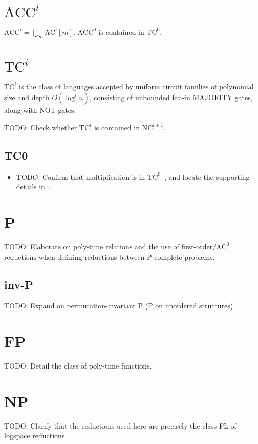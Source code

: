 \section{\texorpdfstring{$\text{ACC}^i$}{ACC\string^i}}
$\text{ACC}^i = \bigcup_m \text{AC}^i[m]$. $\text{ACC}^0$ is contained in $\text{TC}^0$.

\section{\texorpdfstring{$\text{TC}^i$}{TC\string^i}}
$\text{TC}^i$ is the class of languages accepted by uniform circuit families 
of polynomial size and depth $O(\log^i n)$, consisting of unbounded fan-in MAJORITY
gates, along with NOT gates.

TODO: Check whether $\text{TC}^i$ is contained in $\text{NC}^{i + 1}$.
\subsection{TC0}
\begin{itemize}
\item TODO: Confirm that multiplication is in $\text{TC}^0$~\cite{BussLectureNotes}, and locate the supporting details in~\cite{doi:10.1137/0213028}.
\end{itemize}


\section{P}
TODO: Elaborate on poly-time relations and the use of first-order/$\text{AC}^0$ reductions when defining reductions between P-complete problems.

\subsection{inv-P}
TODO: Expand on permutation-invariant P (P on unordered structures).

\section{FP}
TODO: Detail the class of poly-time functions.

\section{NP}
TODO: Clarify that the reductions used here are precisely the class FL of logspace reductions.

